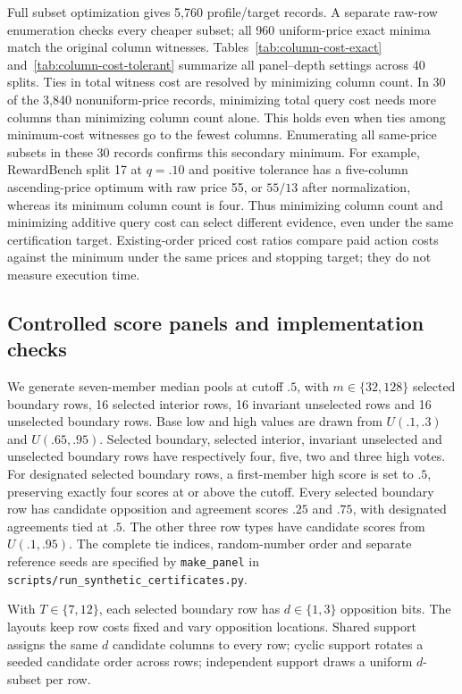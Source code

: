 Full subset optimization gives 5,760 profile/target records. A separate raw-row enumeration checks every cheaper subset; all 960 uniform-price exact minima match the original column witnesses. Tables~\ref{tab:column-cost-exact} and~\ref{tab:column-cost-tolerant} summarize all panel--depth settings across 40 splits. Ties in total witness cost are resolved by minimizing column count. In 30 of the 3,840 nonuniform-price records, minimizing total query cost needs more columns than minimizing column count alone. This holds even when ties among minimum-cost witnesses go to the fewest columns. Enumerating all same-price subsets in these 30 records confirms this secondary minimum. For example, RewardBench split 17 at $q=.10$ and positive tolerance has a five-column ascending-price optimum with raw price 55, or $55/13$ after normalization, whereas its minimum column count is four. Thus minimizing column count and minimizing additive query cost can select different evidence, even under the same certification target. Existing-order priced cost ratios compare paid action costs against the minimum under the same prices and stopping target; they do not measure execution time.



\subsection{Controlled score panels and implementation checks}
\label{app:synthetic-sharing}
We generate seven-member median pools at cutoff $.5$, with $m\in\{32,128\}$ selected boundary rows, 16 selected interior rows, 16 invariant unselected rows and 16 unselected boundary rows. Base low and high values are drawn from $U(.1,.3)$ and $U(.65,.95)$. Selected boundary, selected interior, invariant unselected and unselected boundary rows have respectively four, five, two and three high votes. For designated selected boundary rows, a first-member high score is set to $.5$, preserving exactly four scores at or above the cutoff. Every selected boundary row has candidate opposition and agreement scores $.25$ and $.75$, with designated agreements tied at $.5$. The other three row types have candidate scores from $U(.1,.95)$. The complete tie indices, random-number order and separate reference seeds are specified by \texttt{make\_panel} in \nolinkurl{scripts/run\_synthetic\_certificates.py}. 

With $T\in\{7,12\}$, each selected boundary row has $d\in\{1,3\}$ opposition bits. The layouts keep row costs fixed and vary opposition locations. Shared support assigns the same $d$ candidate columns to every row; cyclic support rotates a seeded candidate order across rows; independent support draws a uniform $d$-subset per row. 

